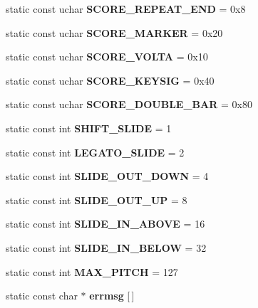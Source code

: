 \begin{DoxyCompactItemize}
static const uchar {\bfseries S\+C\+O\+R\+E\+\_\+\+R\+E\+P\+E\+A\+T\+\_\+\+E\+ND} = 0x8
\item 
\mbox{\label{class_ms_1_1_guitar_pro_a7e0d455e72edeed34fcd49473563e9a7}} 
static const uchar {\bfseries S\+C\+O\+R\+E\+\_\+\+M\+A\+R\+K\+ER} = 0x20
\item 
\mbox{\label{class_ms_1_1_guitar_pro_aaa88d09b1108d13bbbb0c9e9eb02a38a}} 
static const uchar {\bfseries S\+C\+O\+R\+E\+\_\+\+V\+O\+L\+TA} = 0x10
\item 
\mbox{\label{class_ms_1_1_guitar_pro_af640200f275fefa4928365e7a3ecfe2c}} 
static const uchar {\bfseries S\+C\+O\+R\+E\+\_\+\+K\+E\+Y\+S\+IG} = 0x40
\item 
\mbox{\label{class_ms_1_1_guitar_pro_aaa99f5e795fcb98db7ea23ff3e1899d5}} 
static const uchar {\bfseries S\+C\+O\+R\+E\+\_\+\+D\+O\+U\+B\+L\+E\+\_\+\+B\+AR} = 0x80
\item 
\mbox{\label{class_ms_1_1_guitar_pro_ac287f167839ab43f308cbcd074fb04a0}} 
static const int {\bfseries S\+H\+I\+F\+T\+\_\+\+S\+L\+I\+DE} = 1
\item 
\mbox{\label{class_ms_1_1_guitar_pro_a6d5dea1eadc54fa4458e0217f934b29b}} 
static const int {\bfseries L\+E\+G\+A\+T\+O\+\_\+\+S\+L\+I\+DE} = 2
\item 
\mbox{\label{class_ms_1_1_guitar_pro_a51ab4ea084f39facc9c670945f6eede0}} 
static const int {\bfseries S\+L\+I\+D\+E\+\_\+\+O\+U\+T\+\_\+\+D\+O\+WN} = 4
\item 
\mbox{\label{class_ms_1_1_guitar_pro_a947c7cbaa251859a4cb242aa9079c433}} 
static const int {\bfseries S\+L\+I\+D\+E\+\_\+\+O\+U\+T\+\_\+\+UP} = 8
\item 
\mbox{\label{class_ms_1_1_guitar_pro_ad783f36a1fba698cd8857fb71e351ca2}} 
static const int {\bfseries S\+L\+I\+D\+E\+\_\+\+I\+N\+\_\+\+A\+B\+O\+VE} = 16
\item 
\mbox{\label{class_ms_1_1_guitar_pro_a9e823a1b3eba82f8af814492747af53b}} 
static const int {\bfseries S\+L\+I\+D\+E\+\_\+\+I\+N\+\_\+\+B\+E\+L\+OW} = 32
\item 
\mbox{\label{class_ms_1_1_guitar_pro_a1644af82fa13abd794a7300ecad26c74}} 
static const int {\bfseries M\+A\+X\+\_\+\+P\+I\+T\+CH} = 127
\item 
static const char $\ast$ {\bfseries errmsg} \mbox{[}$\,$\mbox{]}
\end{DoxyCompactItemize}


